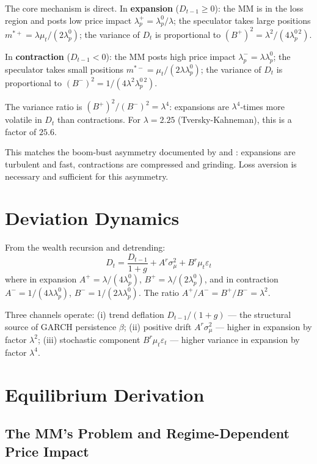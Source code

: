 \documentclass[12pt,a4paper]{article}
\theoremstyle{definition}
\begin{document}
The core mechanism is direct. In \textbf{expansion} ($D_{t-1} \geq 0$):
the MM is in the loss region and posts low price impact
$\lambda^+_p = \lambda^0_p/\lambda$; the speculator takes large positions
$m^{*+} = \lambda\mu_t/(2\lambda^0_p)$; the variance of $D_t$ is
proportional to $(B^+)^2 = \lambda^2/(4\lambda^{0\,2}_p)$.

In \textbf{contraction} ($D_{t-1} < 0$): the MM posts high price impact
$\lambda^-_p = \lambda\lambda^0_p$; the speculator takes small positions
$m^{*-} = \mu_t/(2\lambda\lambda^0_p)$; the variance of $D_t$ is
proportional to $(B^-)^2 = 1/(4\lambda^2\lambda^{0\,2}_p)$.

The variance ratio is $(B^+)^2/(B^-)^2 = \lambda^4$: expansions are
$\lambda^4$-times more volatile in $D_t$ than contractions. For
$\lambda = 2.25$ (Tversky-Kahneman), this is a factor of $25.6$.

This matches the boom-bust asymmetry documented by \citet{kindleberger1978}
and \citet{hamilton1989}: expansions are turbulent and fast, contractions are
compressed and grinding. Loss aversion is necessary and sufficient for
this asymmetry.

\section{Deviation Dynamics}
\label{sec:deviation}

From the wealth recursion and detrending:
\begin{equation}
  D_t = \frac{D_{t-1}}{1+g} + A^r\sigma^2_\mu + B^r\mu_t\varepsilon_t
  \label{eq:deviation_recursion}
\end{equation}
where in expansion $A^+ = \lambda/(4\lambda^0_p)$,
$B^+ = \lambda/(2\lambda^0_p)$, and in contraction
$A^- = 1/(4\lambda\lambda^0_p)$, $B^- = 1/(2\lambda\lambda^0_p)$.
The ratio $A^+/A^- = B^+/B^- = \lambda^2$.

Three channels operate: (i) trend deflation $D_{t-1}/(1+g)$
--- the structural source of GARCH persistence $\beta$; (ii) positive
drift $A^r\sigma^2_\mu$ --- higher in expansion by factor $\lambda^2$;
(iii) stochastic component $B^r\mu_t\varepsilon_t$ --- higher variance
in expansion by factor $\lambda^4$.

\section{Equilibrium Derivation}
\label{sec:equilibrium}

\subsection{The MM's Problem and Regime-Dependent Price Impact}
\label{sec:mm_problem}
\end{document}
